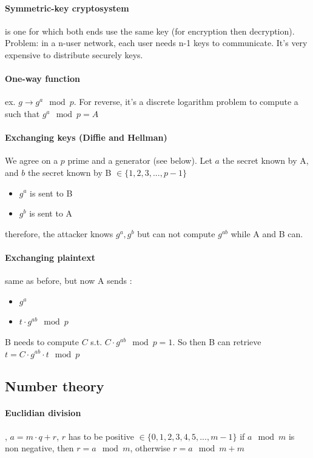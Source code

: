 \documentclass{article}
\begin{document}
\paragraph{Symmetric-key cryptosystem} is one for which both ends use the same key (for encryption then decryption). Problem: in a n-user network, each user needs n-1 keys to communicate. It's very expensive to distribute securely keys.

\paragraph{One-way function} ex. $ g \to g^a \mod{p} $. For reverse, it's a discrete logarithm problem to compute a such that $ g^a \mod p = A $

\paragraph{Exchanging keys (Diffie and Hellman)} We agree on a $ p $ prime and a generator (see below).
Let $ a $ the secret known by A, and $ b $ the secret known by  B $ \in \{ 1, 2, 3, ..., p-1 \} $
\begin{itemize}
    \item $ g^a $ is sent to B
    \item $ g^b $ is sent to A
\end{itemize}
therefore, the attacker knows $ g^a, g^b $ but can not compute $ g^{ab} $ while A and B can.

\paragraph{Exchanging plaintext} same as before, but now A sends :
\begin{itemize}
    \item $ g^a $
    \item $ t \cdot {g^{ab} \mod p} $
\end{itemize}
B needs to compute $ C $ s.t. $ C \cdot g^{ab} \mod p = 1 $.
So then B can retrieve $ t = C \cdot g^{ab} \cdot t \mod p $

\newpage

\subsection{Number theory}

\paragraph{Euclidian division}, $ a = m \cdot q + r $, $ r $ has to be positive $ \in \{0,1,2,3,4,5,...,m-1\}$
if $ a \mod m $ is non negative, then $ r = a \mod m $, otherwise $ r = a \mod m + m $
\end{document}
